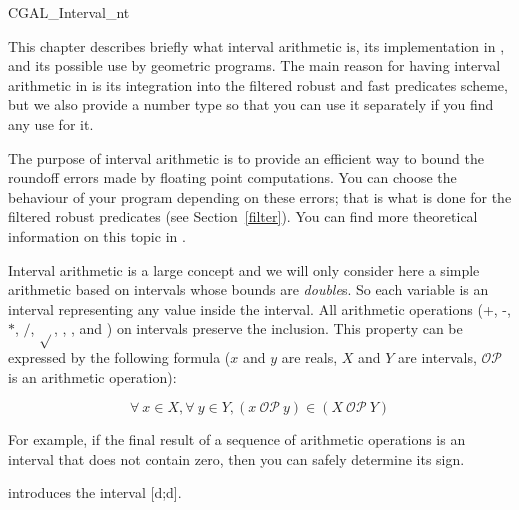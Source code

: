 
\begin{ccClass} {CGAL_Interval_nt}
\label{interval}

This chapter describes briefly what interval arithmetic is, its implementation
in {\cgal}, and its possible use by geometric programs.
The main reason for having interval arithmetic in {\cgal} is its integration
into the filtered robust and fast predicates scheme, but we also provide a
number type so that you can use it separately if you find any use for it.


The purpose of interval arithmetic is to provide an efficient way to bound
the roundoff errors made by floating point computations.
You can choose the behaviour of your program depending on these errors; that
is what is done for the filtered robust predicates (see Section~\ref{filter}).
You can find more theoretical information on this topic in
\cite{bbp-iayea-98}.

\ccDefinition
Interval arithmetic is a large concept and we will only consider here a 
simple arithmetic based on intervals whose bounds are {\it double}s.
So each variable is an interval representing any value inside the interval.
All arithmetic operations (+, -, $*$, $/$, $\sqrt{}$, ,
,
 and ) on intervals preserve the inclusion.
This property can be expressed by the following formula ($x$ and $y$ are
reals, $X$ and $Y$ are intervals, $\mathcal{OP}$ is an arithmetic operation):

$$
\forall\ x \in X, \forall\ y \in Y, (x\ \mathcal{OP}\ y)
\in (X\ \mathcal{OP}\ Y)
$$

For example, if the final result of a sequence of arithmetic operations is
an interval that does not contain zero, then you can safely determine its sign.


\ccCreation

{introduces the interval [d;d].}


\end{ccClass}
